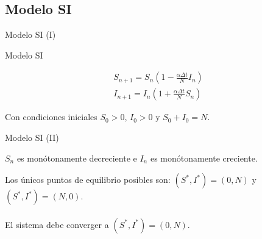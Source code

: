 \subsection{Modelo SI}


\begin{frame}{Modelo SI (I)}

    \begin{block}{Modelo SI  \cite{allenDiscretetimeSISIR1994}}

        \begin{equation}
        \label{eqn: SI}
        \begin{aligned}
        S_{n+1}=S_n\left( 1-\frac{\alpha\Delta t}{N}I_n\right) \\
        I_{n+1}=I_n\left( 1+\frac{\alpha\Delta t}{N}S_n\right)
        \end{aligned}
        \end{equation}

        Con condiciones iniciales $S_0>0$, $I_0>0$ y $S_0+I_0=N$.      

    \end{block}  

    \begin{center}
    \end{center}

\end{frame}

\begin{frame}{Modelo SI (II)}

    \begin{lema}
        $S_n$ es monótonamente decreciente e $I_n$ es monótonamente creciente.
    \end{lema}

    \pause

    Los únicos puntos de equilibrio posibles son: $(S^*,I^*)=(0,N)$ y $(S^*,I^*)=(N,0)$.
    \\~\\
    El sistema debe converger a $(S^*,I^*)=(0,N)$.

\end{frame}


